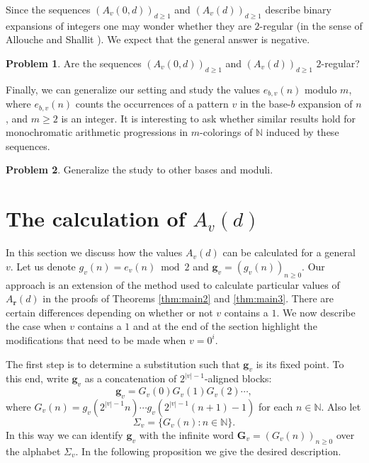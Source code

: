 \documentclass[a4paper,11pt]{amsart}
\theoremstyle{definition}
\newtheorem{prob}{Problem}
\newcommand{\N}{\mathbb{N}}
\begin{document}
Since the sequences $(A_v(0,d))_{d \geq 1}$ and $(A_v(d))_{d \geq 1}$ describe binary expansions of integers one may wonder whether they are $2$-regular (in the sense of Allouche and Shallit \cite{AS92}). We expect that the general answer is negative.

\begin{prob}
Are the sequences $(A_v(0,d))_{d \geq 1}$ and $(A_v(d))_{d \geq 1}$ $2$-regular? 
\end{prob}

Finally, we can generalize our setting and study the values $e_{b,v}(n)$ modulo $m$, where $e_{b,v}(n)$ counts the occurrences of a pattern $v$ in the base-$b$ expansion of $n$, and $m \geq 2$ is an integer. It is interesting to ask whether similar results hold for monochromatic arithmetic progressions in $m$-colorings of $\N$ induced by these sequences. 
\begin{prob}
Generalize the study to other bases and moduli.
\end{prob}



\section{The calculation of $A_v(d)$}  \label{sec:calculation}

In this section we discuss how the values $A_v(d)$ can be calculated for a general $v$. Let us denote $g_v(n) = e_v(n) \bmod{2}$ and $\mathbf{g}_v = (g_v(n))_{n \geq 0}$. Our approach is an extension of the method used to calculate particular values of $A_{\mathbf{r}}(d)$ in the proofs of Theorems \ref{thm:main2} and \ref{thm:main3}. There are certain differences depending on whether or not $v$ contains a $1$. We now describe the case when $v$ contains a $1$ and at the end of the section highlight the modifications that need to be made when $v=0^i$.

The first step is to determine a substitution such that $\mathbf{g}_v$ is its fixed point. To this end, write $\mathbf{g}_v$ as a concatenation of $2^{|v|-1}$-aligned blocks:
$$ \mathbf{g}_v = G_v(0) G_v(1) G_v(2) \cdots,  $$
where $G_v(n) = g_v(2^{|v|-1}n) \cdots g_v(2^{|v|-1}(n+1)-1)$ for each $n \in \N$. Also let 
$$ \Sigma_v = \{G_v(n): n \in \N   \}. $$
In this way we can identify $\mathbf{g}_v$ with the infinite word $\mathbf{G}_v = (G_v(n))_{n \geq 0}$ over the alphabet $\Sigma_v$.  In the following proposition we give the desired description.
\end{document}
